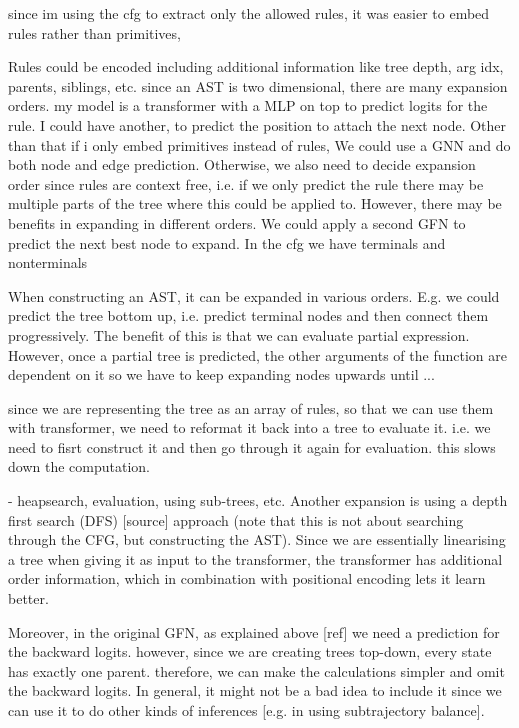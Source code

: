 since im using the cfg to extract only the allowed rules, it was easier to embed rules rather than primitives, 

Rules could be encoded including additional information like tree depth, arg idx, parents, siblings, etc. 
since an AST is two dimensional, there are many expansion orders. 
my model is a transformer with a MLP on top to predict logits for the rule. I could have another, to predict the position to attach the next node. Other than that if i only embed primitives instead of rules, 
We could use a GNN and do both node and edge prediction. 
Otherwise, we also need to decide expansion order since rules are context free, i.e. if we only predict the rule there may be multiple parts of the tree where this could be applied to. However, there may be benefits in expanding in different orders. We could apply a second GFN to predict the next best node to expand.
In the cfg we have terminals and nonterminals

When constructing an AST, it can be expanded in various orders.
E.g. we could predict the tree bottom up, i.e. predict terminal nodes and then connect them progressively. The benefit of this is that we can evaluate partial expression. However, once a partial tree is predicted, the other arguments of the function are dependent on it so we have to keep expanding nodes upwards until ...

since we are representing the tree as an array of rules, so that we can use them with transformer, we need to reformat it back into a tree to evaluate it. i.e. we need to fisrt construct it and then go through it again for evaluation. this slows down the computation. 


- heapsearch, evaluation, using sub-trees, etc. 
Another expansion is using a depth first search (DFS) [source] approach (note that this is not about searching through the CFG, but constructing the AST). Since we are essentially linearising a tree when giving it as input to the transformer, the transformer has additional order information, which in combination with positional encoding lets it learn better. 

Moreover, in the original GFN, as explained above [ref] we need a prediction for the backward logits. however, since we are creating trees top-down, every state has exactly one parent. therefore, we can make the calculations simpler and omit the backward logits. 
In general, it might not be a bad idea to include it since we can use it to do other kinds of inferences [e.g. in using subtrajectory balance].















